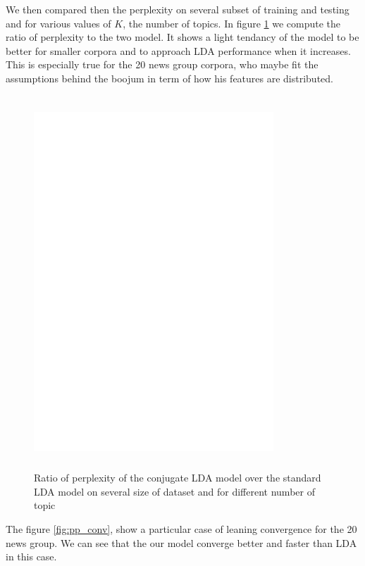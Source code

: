 We then compared then the perplexity on several subset of training and testing and for various values of $K$, the number of topics. In figure \ref{fig:pp_D} we compute the ratio of perplexity to the two model. It shows a light tendancy of the model to be better for smaller corpora and to approach LDA performance when it increases. This is especially true for the 20 news group corpora, who maybe fit the assumptions behind the boojum in term of how his features are distributed. 

\begin{figure}[h]
\label{fig:pp_D}
\includegraphics[width=9cm, height=14cm]{results/pp_D.eps}
\caption{Ratio of perplexity of the conjugate LDA model over the standard LDA model on several size of dataset and for different number of topic}
\end{figure}

The figure \ref{fig:pp_conv}, show a particular case of leaning convergence for the 20 news group. We can see that the our model converge better and faster than LDA in this case. 

